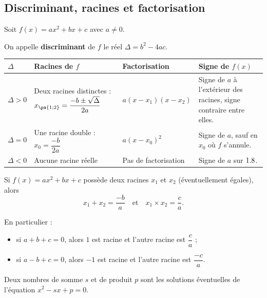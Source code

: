 \subsection{Discriminant, racines et factorisation}

\begin{prop}
	Soit $f(x) = ax^2 + bx + c$ avec $a \neq 0$.

	On appelle \textbf{discriminant} de $f$ le réel $\Delta = b^2 - 4ac$.

	\begin{center}
		\begin{tabular}{|C{1.8cm}|C{4.6cm}|C{3.0cm}|C{5.9cm}|} \hline
			\rule[-3mm]{0mm}{9mm}\ccg $\Delta$ &  \textbf{Racines de $f$}                                                  &  \textbf{Factorisation} &  \textbf{Signe de $f(x)$}                            \\ \hline
			\rule[-6mm]{0mm}{20mm}$\Delta > 0$ & Deux racines distinctes :\vspace{2mm} $x_{\pa{1;2}} = \dfrac{-b \pm \sqrt{\Delta}}{2a}$ & $a(x - x_1)(x - x_2)$                 & Signe de $a$ à l'extérieur des racines, signe contraire entre elles. \\ \hline
			\rule[-6mm]{0mm}{14mm}$\Delta = 0$ & Une racine double : $x_0 = \dfrac{-b}{2a}$                                              & $a(x - x_0)^2$                        & Signe de $a$, sauf en $x_0$ où $f$ s'annule.                         \\ \hline
			\rule[-4mm]{0mm}{15mm}$\Delta < 0$ & Aucune racine réelle                                                                    & Pas de factorisation                  & Signe de $a$ sur $1.8$.                                               \\ \hline
		\end{tabular}
	\end{center}
\end{prop}

\newpage

\begin{prop}
	Si $f(x) = ax^2 + bx + c$ possède deux racines $x_1$ et $x_2$ (éventuellement égales), alors
	\[
		x_1 + x_2 = \dfrac{-b}{a} \quad \text{et} \quad x_1 \times x_2 = \dfrac{c}{a}.
	\]

	En particulier :
	\begin{itemize}
		\item si $a + b + c = 0$, alors $1$ est racine et l'autre racine est $\dfrac{c}{a}$ ;
		\item si $a - b + c = 0$, alors $-1$ est racine et l'autre racine est $\dfrac{-c}{a}$.
	\end{itemize}

	Deux nombres de somme $s$ et de produit $p$ sont les solutions éventuelles de l'équation $x^2 - sx + p = 0$.
\end{prop}

